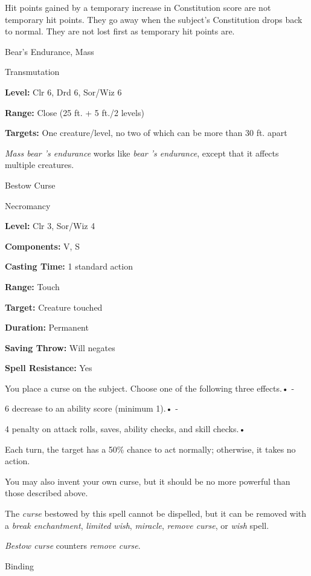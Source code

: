 \documentclass{article}
\begin{document}
Hit points gained by a temporary increase in Constitution score are not temporary 
hit points. They go away when the subject's Constitution drops back to normal. 
They are not lost first as temporary hit points are.

\vspace{12pt}
Bear's Endurance, Mass

Transmutation

\textbf{Level:} Clr 6, Drd 6, Sor/Wiz 6

\textbf{Range:} Close (25 ft. + 5 ft./2 levels)

\textbf{Targets:} One creature/level, no two of which can be more than 30 ft. apart

\textit{Mass bear 's endurance }works like \textit{bear 's endurance}, except that 
it affects multiple creatures.

\vspace{12pt}
Bestow Curse

Necromancy

\textbf{Level:} Clr 3, Sor/Wiz 4

\textbf{Components:} V, S

\textbf{Casting Time:} 1 standard action

\textbf{Range:} Touch

\textbf{Target:} Creature touched

\textbf{Duration:} Permanent

\textbf{Saving Throw: }Will negates

\textbf{Spell Resistance:} Yes

You place a curse on the subject. Choose one of the following three effects.• 
-

6 decrease to an ability score (minimum 1).• -

4 penalty on attack rolls, saves, ability checks, and skill checks.• 

Each turn, the target has a 50\% chance to act normally; otherwise, it takes no 
action.

You may also invent your own curse, but it should be no more powerful than those 
described above.

The \textit{curse }bestowed by this spell cannot be dispelled, but it can be removed 
with a \textit{break enchantment}, \textit{limited wish}, \textit{miracle}, \textit{remove 
curse}, or \textit{wish }spell.

\textit{Bestow curse }counters \textit{remove curse}.

\vspace{12pt}
Binding
\end{document}
